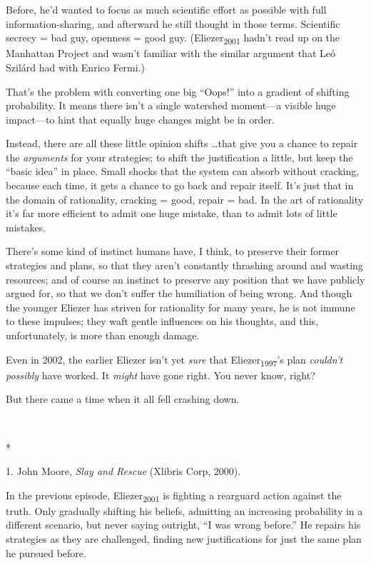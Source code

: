 {
 Before, he'd wanted to focus as much scientific
effort as possible with full information-sharing, and afterward he
still thought in those terms. Scientific secrecy = bad guy, openness =
good guy. (Eliezer\textsubscript{2001} hadn't read up
on the Manhattan Project and wasn't familiar with the
similar argument that Leó Szilárd had with Enrico Fermi.)}

{
 That's the problem with converting one big
``Oops!'' into a gradient of
shifting probability. It means there isn't a single
watershed moment---a visible huge impact---to hint that equally huge
changes might be in order.}

{
 Instead, there are all these little opinion shifts \ldots that give
you a chance to repair the \textit{arguments} for your strategies; to
shift the justification a little, but keep the ``basic
idea'' in place. Small shocks that the system can
absorb without cracking, because each time, it gets a chance to go back
and repair itself. It's just that in the domain of
rationality, cracking = good, repair = bad. In the art of rationality
it's far more efficient to admit one huge mistake, than
to admit lots of little mistakes.}

{
 There's some kind of instinct humans have, I
think, to preserve their former strategies and plans, so that they
aren't constantly thrashing around and wasting
resources; and of course an instinct to preserve any position that we
have publicly argued for, so that we don't suffer the
humiliation of being wrong. And though the younger Eliezer has striven
for rationality for many years, he is not immune to these impulses;
they waft gentle influences on his thoughts, and this, unfortunately,
is more than enough damage.}

{
 Even in 2002, the earlier Eliezer isn't yet
\textit{sure} that Eliezer\textsubscript{1997}'s plan
\textit{couldn't possibly} have worked. It
\textit{might} have gone right. You never know, right?}

{
 But there came a time when it all fell crashing down.}

{\centering
 \ ~
\par}

{\centering
 *
\par}


\bigskip

{
 1. John Moore, \textit{Slay and Rescue} (Xlibris Corp, 2000).}


{
 In the previous episode, Eliezer\textsubscript{2001} is fighting a
rearguard action against the truth. Only gradually shifting his
beliefs, admitting an increasing probability in a different scenario,
but never saying outright, ``I was wrong
before.'' He repairs his strategies as they are
challenged, finding new justifications for just the same plan he
pursued before. }

